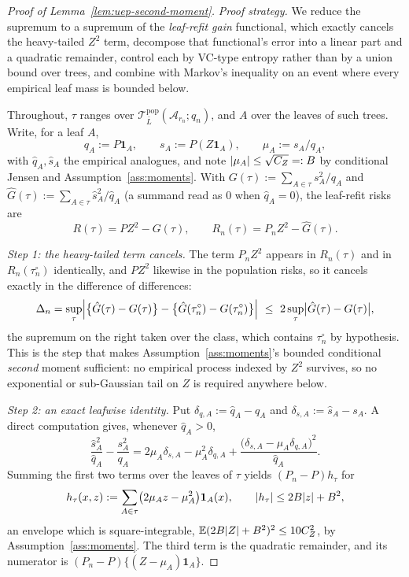 \documentclass[11pt]{article}
\theoremstyle{plain}
\theoremstyle{definition}
\theoremstyle{remark}
\newcommand{\E}{\mathbb{E}}
\newcommand{\cA}{\mathcal{A}}
\newcommand{\cT}{\mathcal{T}}
\DeclarePairedDelimiter{\abs}{\lvert}{\rvert}
\begin{document}
\begin{proof}[Proof of Lemma~\ref{lem:uep-second-moment}]
\emph{Proof strategy.}
We reduce the supremum to a supremum of the \emph{leaf-refit gain} functional,
which exactly cancels the heavy-tailed \(Z^2\) term, decompose that
functional's error into a linear part and a quadratic remainder, control each
by VC-type entropy rather than by a union bound over trees, and combine with
Markov's inequality on an event where every empirical leaf mass is bounded
below.

Throughout, \(\tau\) ranges over
\(\cT^{\mathrm{pop}}_{\bar L}(\cA_{r_n};q_n)\), and \(A\) over the leaves of
such trees. Write, for a leaf \(A\),
\[
  q_A:=P\mathbf 1_A,
  \qquad
  s_A:=P(Z\mathbf 1_A),
  \qquad
  \mu_A:=s_A/q_A,
\]
with \(\hat q_A,\hat s_A\) the empirical analogues, and note
\(\abs{\mu_A}\le\sqrt{C_Z}=:B\) by conditional Jensen and
Assumption~\ref{ass:moments}. With \(G(\tau):=\sum_{A\in\tau}s_A^2/q_A\) and
\(\hat G(\tau):=\sum_{A\in\tau}\hat s_A^2/\hat q_A\) (a summand read as \(0\)
when \(\hat q_A=0\)), the leaf-refit risks are
\[
  R(\tau)=PZ^2-G(\tau),
  \qquad
  R_n(\tau)=P_nZ^2-\hat G(\tau).
\]

\emph{Step 1: the heavy-tailed term cancels.}
The term \(P_nZ^2\) appears in \(R_n(\tau)\) and in \(R_n(\tau_n^\circ)\)
identically, and \(PZ^2\) likewise in the population risks, so it cancels
exactly in the difference of differences:
\[
  \Delta_n
  =
  \sup_\tau\Bigl|
    \bigl\{\hat G(\tau)-G(\tau)\bigr\}
    -\bigl\{\hat G(\tau_n^\circ)-G(\tau_n^\circ)\bigr\}
  \Bigr|
  \ \le\
  2\sup_\tau\bigl|\hat G(\tau)-G(\tau)\bigr| ,
\]
the supremum on the right taken over the class, which contains
\(\tau_n^\circ\) by hypothesis. This is the step that makes
Assumption~\ref{ass:moments}'s bounded conditional \emph{second} moment
sufficient: no empirical process indexed by \(Z^2\) survives, so no
exponential or sub-Gaussian tail on \(Z\) is required anywhere below.

\emph{Step 2: an exact leafwise identity.}
Put \(\delta_{q,A}:=\hat q_A-q_A\) and \(\delta_{s,A}:=\hat s_A-s_A\). A
direct computation gives, whenever \(\hat q_A>0\),
\[
  \frac{\hat s_A^2}{\hat q_A}-\frac{s_A^2}{q_A}
  =
  2\mu_A\delta_{s,A}-\mu_A^2\delta_{q,A}
  +\frac{\bigl(\delta_{s,A}-\mu_A\delta_{q,A}\bigr)^2}{\hat q_A}.
\]
Summing the first two terms over the leaves of \(\tau\) yields
\((P_n-P)h_\tau\) for
\[
  h_\tau(x,z):=\sum_{A\in\tau}\bigl(2\mu_Az-\mu_A^2\bigr)\mathbf 1_A(x),
  \qquad
  \abs{h_\tau}\le2B\abs z+B^2 ,
\]
an envelope which is square-integrable, \(\E(2B\abs Z+B^2)^2\le10C_Z^2\), by
Assumption~\ref{ass:moments}. The third term is the quadratic remainder, and
its numerator is \((P_n-P)\{(Z-\mu_A)\mathbf 1_A\}\).


\end{proof}
\end{document}
